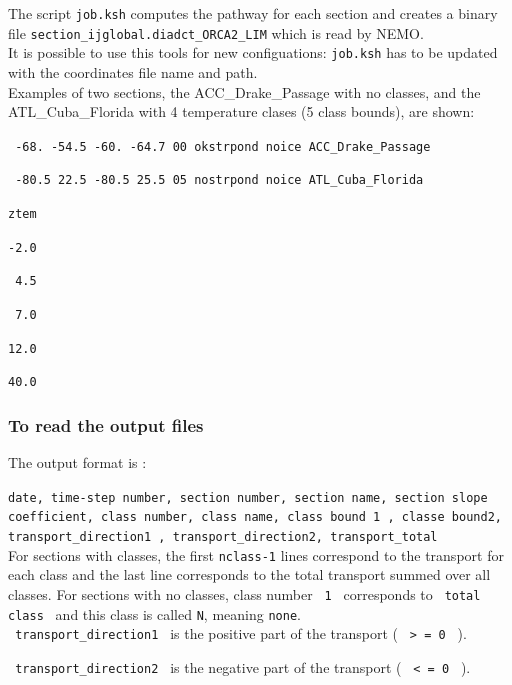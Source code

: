   
The script \texttt{job.ksh} computes the pathway for each section and creates a binary file 
\texttt{section\_ijglobal.diadct\_ORCA2\_LIM} which is read by NEMO. \\

It is possible to use this tools for new configuations: \texttt{job.ksh} has to be updated 
with the coordinates file name and path. \\


Examples of two sections, the ACC\_Drake\_Passage with no classes, and the
 ATL\_Cuba\_Florida with 4 temperature clases (5 class bounds), are shown:

\noindent \texttt{ -68.    -54.5   -60.    -64.7  00 okstrpond noice ACC\_Drake\_Passage}

\noindent \texttt{ -80.5    22.5   -80.5    25.5  05 nostrpond noice ATL\_Cuba\_Florida}

\noindent \texttt{ztem}

\noindent \texttt{-2.0}

\noindent \texttt{ 4.5}

\noindent \texttt{ 7.0}

\noindent \texttt{12.0}

\noindent \texttt{40.0}


\subsubsection{ To read the output files }

The output format is :
 
{\small\texttt{date, time-step number, section number, section name, section slope coefficient, class number, 
class name, class bound 1 , classe bound2, transport\_direction1 ,  transport\_direction2, transport\_total}}\\


For sections with classes, the first \texttt{nclass-1} lines correspond to the transport for each class 
and the last line corresponds to the total transport summed over all classes. For sections with no classes, class number
\texttt{ 1 } corresponds to \texttt{ total class } and this class is called  \texttt{N}, meaning \texttt{none}.\\


\noindent \texttt{ transport\_direction1 } is the positive part of the transport ( \texttt{ > = 0 } ).

\noindent \texttt{ transport\_direction2 } is the negative part of the transport ( \texttt{ < = 0 } ).\\


